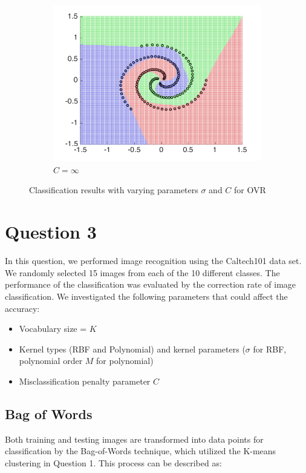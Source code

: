 \documentclass[10pt,twocolumn,letterpaper]{article}
\begin{document}
\begin{figure}
\begin{subfigure}[H]{0.3 \columnwidth}
		\includegraphics[width = 1\columnwidth]{q2_ovr_Cinf}
		\caption{$C = \infty$}
	\end{subfigure}
	
	\caption{Classification results with varying parameters $\sigma$ and $C$ for OVR}
	\label{fig:q2_ovr_all}
\end{figure}



\section{Question 3}
In this question, we performed image recognition using the Caltech101 data set. We randomly selected 15 images from each of the 10 different classes. The performance of the classification was evaluated by the correction rate of image classification. We investigated the following parameters that could affect the accuracy:

\begin{itemize}
	\item Vocabulary size = $K$
	\item Kernel types (RBF and Polynomial) and kernel parameters ($\sigma$ for RBF, polynomial order $M$ for polynomial)
	\item Misclassification penalty parameter $C$
\end{itemize}


\subsection{Bag of Words}
Both training and testing images are transformed into data points for classification by the Bag-of-Words technique, which utilized the K-means clustering in Question 1. This process can be described as:
\end{document}
